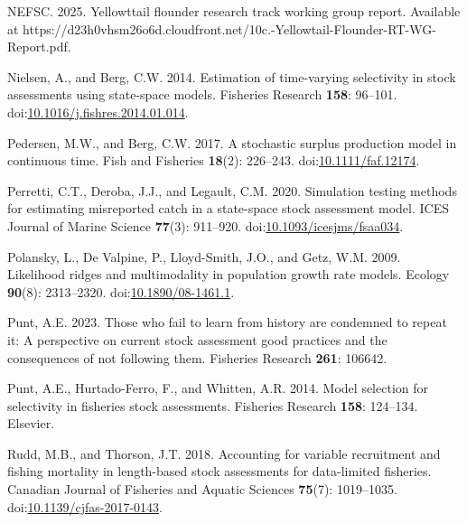\documentclass[
  12pt,
]{article}
\newlength{\cslhangindent}
\newlength{\cslentryspacingunit} %
\newenvironment{CSLReferences}[2] %
 {%
  \setlength{\parindent}{0pt}
  \ifodd #1
  \let\oldpar\par
  \def\par{\hangindent=\cslhangindent\oldpar}
  \fi
  \setlength{\parskip}{#2\cslentryspacingunit}
 }%
 {}
\begin{document}
\begin{CSLReferences}{1}{0}
\leavevmode{}%
NEFSC. 2025. Yellowttail flounder research track working group report.
{Available} at
https://d23h0vhsm26o6d.cloudfront.net/10c.-Yellowtail-Flounder-RT-WG-Report.pdf.

\leavevmode{}%
Nielsen, A., and Berg, C.W. 2014. Estimation of time-varying selectivity
in stock assessments using state-space models. Fisheries Research
\textbf{158}: 96--101.
doi:\href{https://doi.org/10.1016/j.fishres.2014.01.014}{10.1016/j.fishres.2014.01.014}.

\leavevmode{}%
Pedersen, M.W., and Berg, C.W. 2017. A stochastic surplus production
model in continuous time. Fish and Fisheries \textbf{18}(2): 226--243.
doi:\href{https://doi.org/10.1111/faf.12174}{10.1111/faf.12174}.

\leavevmode{}%
Perretti, C.T., Deroba, J.J., and Legault, C.M. 2020. Simulation testing
methods for estimating misreported catch in a state-space stock
assessment model. ICES Journal of Marine Science \textbf{77}(3):
911--920.
doi:\href{https://doi.org/10.1093/icesjms/fsaa034}{10.1093/icesjms/fsaa034}.

\leavevmode{}%
Polansky, L., De Valpine, P., Lloyd-Smith, J.O., and Getz, W.M. 2009.
Likelihood ridges and multimodality in population growth rate models.
Ecology \textbf{90}(8): 2313--2320.
doi:\href{https://doi.org/10.1890/08-1461.1}{10.1890/08-1461.1}.

\leavevmode{}%
Punt, A.E. 2023. Those who fail to learn from history are condemned to
repeat it: A perspective on current stock assessment good practices and
the consequences of not following them. Fisheries Research \textbf{261}:
106642.

\leavevmode{}%
Punt, A.E., Hurtado-Ferro, F., and Whitten, A.R. 2014. Model selection
for selectivity in fisheries stock assessments. Fisheries Research
\textbf{158}: 124--134. Elsevier.

\leavevmode{}%
Rudd, M.B., and Thorson, J.T. 2018. Accounting for variable recruitment
and fishing mortality in length-based stock assessments for data-limited
fisheries. Canadian Journal of Fisheries and Aquatic Sciences
\textbf{75}(7): 1019--1035.
doi:\href{https://doi.org/10.1139/cjfas-2017-0143}{10.1139/cjfas-2017-0143}.


\end{CSLReferences}
\end{document}

